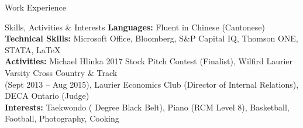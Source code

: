 \documentclass{resume} %
\begin{document}
\begin{rSection}{Work Experience}




 
\end{rSection}


\begin{rSection}{Skills, Activities \& Interests}
{\bf Languages:} {Fluent in Chinese (Cantonese)} 
\\
{\bf Technical Skills:} {Microsoft Office, Bloomberg, S\&P Capital IQ, Thomson ONE, STATA, \LaTeX}
\\
{\bf Activities:} {Michael Hlinka 2017 Stock Pitch Contest (Finalist), Wilfird Laurier Varsity Cross Country \& Track \\ (Sept 2013 -- Aug 2015), Laurier Economics Club (Director of Internal Relations), DECA Ontario (Judge)} %
\\
{\bf Interests:} {Taekwondo ( Degree Black Belt), Piano (RCM Level 8), Basketball, Football, Photography, Cooking}

\end{rSection}
\end{document}
